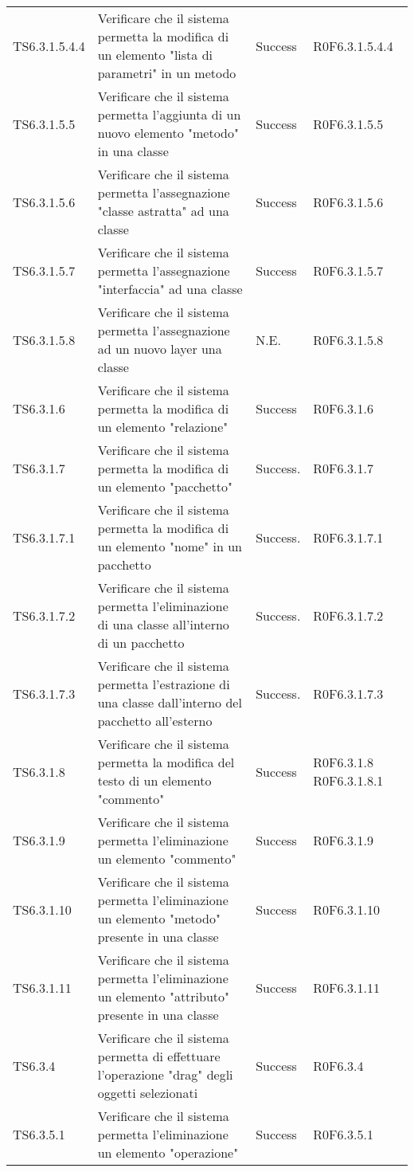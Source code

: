 \begin{longtable}{p{2.5cm}!{\VRule[1pt]}p{6cm}!{\VRule[1pt]}p{1.5cm}!{\VRule[1pt]}p{3cm}}
TS6.3.1.5.4.4 & Verificare che il sistema permetta la modifica di un elemento "lista di parametri" in un metodo & Success & R0F6.3.1.5.4.4\\
TS6.3.1.5.5 & Verificare che il sistema permetta l'aggiunta di un nuovo elemento "metodo" in una classe & Success & R0F6.3.1.5.5\\
TS6.3.1.5.6 & Verificare che il sistema permetta l'assegnazione "classe astratta" ad una classe & Success & R0F6.3.1.5.6\\
TS6.3.1.5.7 & Verificare che il sistema permetta l'assegnazione "interfaccia" ad una classe & Success & R0F6.3.1.5.7\\
TS6.3.1.5.8 & Verificare che il sistema permetta l'assegnazione ad un nuovo layer una classe & N.E. & R0F6.3.1.5.8\\
TS6.3.1.6 & Verificare che il sistema permetta la modifica di un elemento "relazione" & Success & R0F6.3.1.6\\
TS6.3.1.7 & Verificare che il sistema permetta la modifica di un elemento "pacchetto" & Success. & R0F6.3.1.7\\
TS6.3.1.7.1 & Verificare che il sistema permetta la modifica di un elemento "nome" in un pacchetto & Success. & R0F6.3.1.7.1\\
TS6.3.1.7.2 & Verificare che il sistema permetta l'eliminazione di una classe all'interno di un pacchetto & Success. & R0F6.3.1.7.2\\
TS6.3.1.7.3 & Verificare che il sistema permetta l'estrazione di una classe dall'interno del pacchetto all'esterno & Success. & R0F6.3.1.7.3\\
TS6.3.1.8 & Verificare che il sistema permetta la modifica del testo di un elemento "commento" & Success & R0F6.3.1.8 R0F6.3.1.8.1\\
TS6.3.1.9 & Verificare che il sistema permetta l'eliminazione un elemento "commento" & Success & R0F6.3.1.9\\
TS6.3.1.10 & Verificare che il sistema permetta l'eliminazione un elemento "metodo" presente in una classe & Success & R0F6.3.1.10\\
TS6.3.1.11 & Verificare che il sistema permetta l'eliminazione un elemento "attributo" presente in una classe & Success & R0F6.3.1.11\\
TS6.3.4 & Verificare che il sistema permetta di effettuare l'operazione "drag" degli oggetti selezionati & Success & R0F6.3.4\\
TS6.3.5.1 & Verificare che il sistema permetta l'eliminazione un elemento "operazione" & Success & R0F6.3.5.1\\

\end{longtable}
